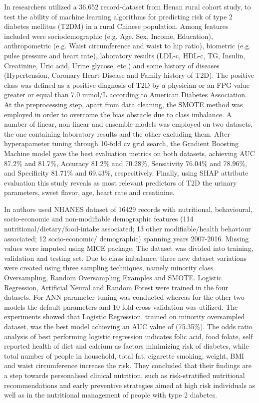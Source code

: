 \documentclass[journal,article,submit,pdftex,moreauthors]{Definitions/mdpi}
\begin{document}
\par In \cite{zhang} researchers utilized a 36,652 record-dataset from Henan rural cohort study,
to test the ability of machine learning algorithms for predicting risk of type 2 diabetes mellitus 
(T2DM) in a rural Chinese population. Among features included were sociodemographic (e.g. Age, Sex, Income, Education),
anthropometric (e.g. Waist circumference and waist to hip ratio),  biometric (e.g. pulse pressure and heart rate),
laboratory results (LDL-c, HDL-c, TG, Insulin, Creatinine, Uric acid, Urine glycose, etc.) and some history of diseases 
(Hypertension, Coronary Heart Disease and Family history of T2D). The positive class was defined as a positive diagnosis
of T2D by a physician or an FPG value greater or equal than 7.0 mmol/L according to American Diabetes Association.
At the preprocessing step, apart from data cleaning, the SMOTE method was employed in order to overcome the bias 
obstacle due to class imbalance. A number of linear, non-linear and ensemble models was employed on two datasets,
the one containing laboratory results and the other excluding them. After hyperapameter tuning through 10-fold cv grid search,
the Gradient Boosting Machine model gave the best evaluation metrics on both datasets, achieving AUC 87.2\% and 81.7\%, Accuracy 81.2\% and 70.28\%, Sensitivity 76.04\%
and 78.96\%, and Specificity 81.71\% and 69.43\%, respecitively. Finally, using SHAP attribute evaluation this study reveals
as most relevant predictors of T2D the urinary parameters, sweet flavor, age, heart rate and creatinine.


\par In \cite{DeSilva} authors used NHANES dataset of 16429 records with nutritional,
behavioural, socio-economic and non-modifiable demographic features (114 nutritional/dietary/food-intake associated;
13 other modifiable/health behaviour associated; 12 socio-economic/ demographic) spanning years 2007-2016.
Missing values were imputed using MICE package. The dataset 
was divided into training, validation and testing set. Due
to class imbalance, three new dataset variations were created using three sampling techniques,
namely minority class Oversampling, Random Oversampling Examples and  SMOTE.
Logistic Regression, Artificial Neural and Random Forest were trained in the four datasets. For
ANN parameter tuning was conducted whereas for the other 
two models the default parameters and 10-fold cross validation was utilized. The experiments showed  that Logistic
Regression, trained on minority oversampled dataset, was the best model achieving an AUC value of (75.35\%).
The odds ratio analysis of best performing  logistic regression indicates folic acid, food folate,
self reported health of diet and 
calcium as factors minimizing risk of diabetes, while total number of people in household,
total fat, cigarette smoking, weight, BMI and waist circumference increase the risk. They concluded
that their findings are a step towards personalised clinical nutrition, such as risk-stratified nutritional recommendations
and early preventive strategies aimed at high risk individuals as well as in the nutritional
management of people with type 2 diabetes. 
\end{document}
